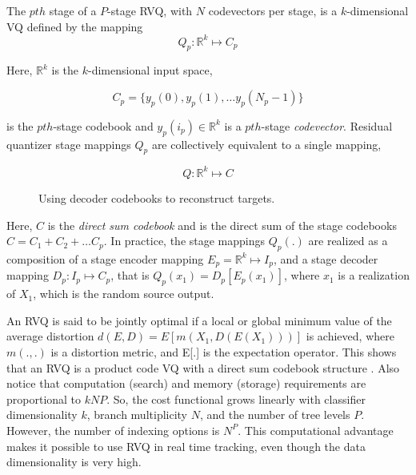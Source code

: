 \documentclass{article}
\begin{document}
The $pth$ stage of a $P$-stage RVQ, with $N$ codevectors per stage, is a $k$-dimensional VQ defined by the mapping 
\begin{equation}
Q_p : \mathbb{R}^k \mapsto C_p
\end{equation}
  
Here, $\mathbb{R}^k$ is the $k$-dimensional input space,   

\begin{equation}
C_p = \{y_p(0), y_p(1), \ldots y_p(N_p - 1) \}
\end{equation}

is the $pth$-stage codebook and $y_p(i_p) \in \mathbb{R}^k$ is a $pth$-stage \emph{codevector}.  
Residual quantizer stage mappings $Q_p$ are collectively equivalent to a single mapping,

\begin{equation}
Q : \mathbb{R}^k \mapsto C
\end{equation}

\begin{figure}%
			\centering	
			\caption{Using decoder codebooks to reconstruct targets.} 
			\label{fig:Codebooks_and_reconstruction}				
\end{figure}


Here, $C$ is the \emph{direct sum codebook} and is the direct sum of the stage codebooks $C=C_1 + C_2 + \ldots C_p$.  
In practice, the stage mappings $Q_p(.)$ are realized as a composition of a stage encoder mapping $E_p = \mathbb{R}^k \mapsto I_p$, and a stage decoder mapping $D_p: I_p \mapsto C_p$, that is $Q_p(x_1) = D_p[E_p(x_1)]$, where $x_1$ is a realization of $X_1$, which is the random source output.  


An RVQ is said to be jointly optimal if a local or global minimum value of the average distortion $d(E,D) = E[m(X_1, D(E(X_1)))]$ is achieved, where $m(.,.)$ is a distortion metric, and E[.] is the expectation operator.  This shows that an RVQ is a product code VQ with a direct sum codebook structure \cite{1993_JNL_RVQDSC_Barnes}.  Also notice that computation (search) and memory (storage) requirements are proportional to $kNP$.  So, the cost functional grows linearly with classifier dimensionality $k$, branch multiplicity $N$, and the number of tree levels $P$.  However, the number of indexing options is $N^P$.  This computational advantage makes it possible to use RVQ in real time tracking, even though the data dimensionality is very high.
\end{document}
